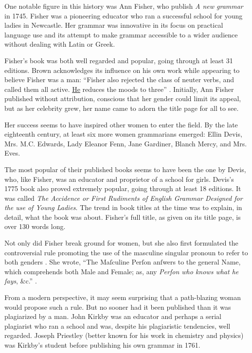\bigskip

One notable figure in this history was Ann Fisher, who publish \textit{A new grammar} in 1745. Fisher was a pioneering educator who ran a successful school for young ladies in Newcastle. Her grammar was innovative in its focus on practical language use and its attempt to make grammar accessible to a wider audience without dealing with Latin or Greek.

Fisher's book was both well regarded and popular, going through at
least 31 editions. Brown acknowledges its influence on his own work while appearing to
believe Fisher was a man: \enquote{Fisher also rejected the class of
neuter verbs, and called them all active. \uline{He} reduces the moods to
three} \citep[138]{brown_grammar_grammars}. Initially, Ann Fisher
published without attribution, conscious that her gender could limit its
appeal, but as her celebrity grew, her name came to adorn the title page for
all to see.

Her success seems to have inspired other women to enter the field. By the
late eighteenth century, at least six more women grammarians emerged:
Ellin Devis, Mrs. M.C. Edwards, Lady Eleanor Fenn, Jane Gardiner, Blanch
Mercy, and Mrs. Eves.

The most popular of their published books seems to have been the one by
Devis, who, like Fisher, was an educator and proprietor of a school for
girls. Devis's 1775 book also proved extremely popular, going through at
least 18 editions. It was called \textit{The Accidence or First Rudiments of English Grammar Designed for the use of Young Ladies}. The trend in book titles at the
time was to explain, in detail, what the book was about. Fisher's full
title, as given on its title page, is over 130 words long.

Not only did Fisher break ground for women, but she also first formulated the controversial rule promoting the use of the masculine singular pronoun  to refer to both genders \citep{Tieken-Boon}. She wrote, \enquote{The Maſculine Perſon anſwers to the general Name, which comprehends both Male and Female; as, any \textit{Perſon who knows what he ſays}, \&c.} \citep[106]{Fisher1785}.

From a modern perspective, it may seem surprising that a path-blazing woman would propose such a rule. But no sooner had it been published than it was plagiarized by a man. John Kirkby was an educator and perhaps a serial plagiarist who ran a school and was, despite his plagiaristic tendencies, well regarded. Joseph Priestley
(better known for his work in chemistry and physics) was Kirkby's student before publishing his own grammar in 1761.

